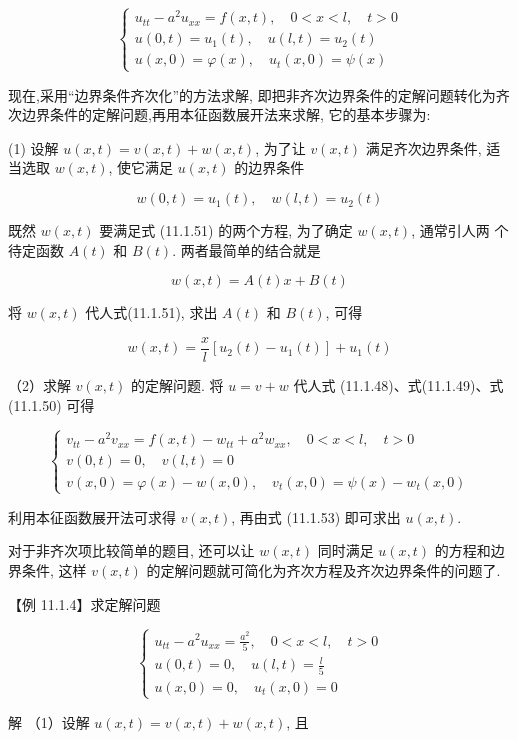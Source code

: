 $$
\begin{cases}u_{t t}-a^{2} u_{x x}=f(x, t), \quad 0<x<l, \quad t>0 \\ u(0, t)=u_{1}(t), \quad u(l, t)=u_{2}(t) \\ u(x, 0)=\varphi(x), \quad u_{t}(x, 0)=\psi(x)\end{cases}
$$

现在,采用“边界条件齐次化”的方法求解, 即把非齐次边界条件的定解问题转化为齐次边界条件的定解问题,再用本征函数展开法来求解, 它的基本步骤为:

(1) 设解 $u(x, t)=v(x, t)+w(x, t)$, 为了让 $v(x, t)$ 满足齐次边界条件, 适当选取 $w(x, t)$, 使它满足 $u(x, t)$ 的边界条件

$$
w(0, t)=u_{1}(t), \quad w(l, t)=u_{2}(t)
$$

既然 $w(x, t)$ 要满足式 (11.1.51) 的两个方程, 为了确定 $w(x, t)$, 通常引人两
个待定函数 $A(t)$ 和 $B(t)$. 两者最简单的结合就是

$$
w(x, t)=A(t) x+B(t)
$$

将 $w(x, t)$ 代人式(11.1.51), 求出 $A(t)$ 和 $B(t)$, 可得

$$
w(x, t)=\frac{x}{l}\left[u_{2}(t)-u_{1}(t)\right]+u_{1}(t)
$$

（2）求解 $v(x, t)$ 的定解问题. 将 $u=v+w$ 代人式 (11.1.48)、式(11.1.49)、式 (11.1.50) 可得

$$
\left\{\begin{array}{l}
v_{t t}-a^{2} v_{x x}=f(x, t)-w_{t t}+a^{2} w_{x x}, \quad 0<x<l, \quad t>0 \\
v(0, t)=0, \quad v(l, t)=0 \\
v(x, 0)=\varphi(x)-w(x, 0), \quad v_{t}(x, 0)=\psi(x)-w_{t}(x, 0)
\end{array}\right.
$$

利用本征函数展开法可求得 $v(x, t)$, 再由式 (11.1.53) 即可求出 $u(x, t)$.

对于非齐次项比较简单的题目, 还可以让 $w(x, t)$ 同时满足 $u(x, t)$ 的方程和边界条件, 这样 $v(x, t)$ 的定解问题就可简化为齐次方程及齐次边界条件的问题了.

【例 11.1.4】求定解问题

$$
\left\{\begin{array}{l}
u_{t t}-a^{2} u_{x x}=\frac{a^{2}}{5}, \quad 0<x<l, \quad t>0 \\
u(0, t)=0, \quad u(l, t)=\frac{l}{5} \\
u(x, 0)=0, \quad u_{t}(x, 0)=0
\end{array}\right.
$$

解 （1）设解 $u(x, t)=v(x, t)+w(x, t)$, 且

